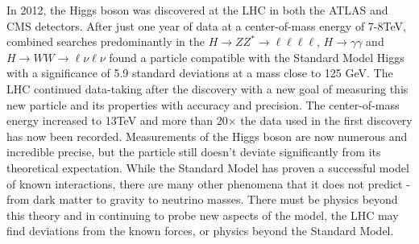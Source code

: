 In 2012, the Higgs boson was discovered at the LHC in both the ATLAS and CMS detectors. After just one year of data at a center-of-mass energy of 7-8TeV, combined searches predominantly in the $H\rightarrow ZZ^*\rightarrow \ell\ell\ell\ell$, $H\rightarrow \gamma\gamma$ and $H\rightarrow WW \rightarrow \ell\nu\ell\nu$ found a particle compatible with the Standard Model Higgs with a significance of 5.9 standard deviations at a mass close to 125 GeV. The LHC continued data-taking after the discovery with a new goal of measuring this new particle and its properties with accuracy and precision. The center-of-mass energy increased to 13TeV and more than 20$\times$ the data used in the first discovery has now been recorded. Measurements of the Higgs boson are now numerous and incredible precise, but the particle still doesn't deviate significantly from its theoretical expectation. While the Standard Model has proven a successful model of known interactions, there are many other phenomena that it does not predict - from dark matter to gravity to neutrino masses. There must be physics beyond this theory and in continuing to probe new aspects of the model, the LHC may find deviations from the known forces, or physics beyond the Standard Model.

